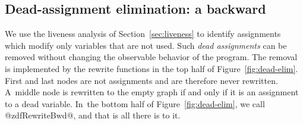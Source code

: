 \documentclass[blockstyle,preprint,nocopyrightspace]{sigplanconf}
\newcommand{\authornote}[1]{{\em #1}}
\def\authornote#1{\unskip\relax}
\newcommand{\simon}[1]{\authornote{SLPJ: #1}}
\newcommand{\norman}[1]{\authornote{NR: #1}}
\let\remark\norman
\newcommand{\john}[1]{\authornote{JD: #1}}
\newcommand\secref[1]{Section~\ref{sec:#1}}
\newcommand\seclabel[1]{\label{sec:#1}}
\newcommand\figref[1]{Figure~\ref{fig:#1}}
\begin{document}
\subsection{Dead-assignment elimination: a backward }
\simon{Backward reference needed to ``Pass 3 of the algorithm described
in the preamble to Section 4''}

\seclabel{dead-code-elimination}
\seclabel{dead-code-elim}

\seclabel{bwd-rewrite}


\def\liveout{$\mathit{live_{out}}$}

We use the liveness analysis of \secref{liveness} to identify
assignments which modify only variables that are not used.
Such \emph{dead assignments} can be removed without changing the
observable behavior of the program.
The removal is implemented by the rewrite functions in the top half of
\figref{dead-elim}. 
First and last nodes are not assignments and are therefore never
rewritten.
A~middle node is rewritten to the empty graph if and only if it is an
assignment to a dead variable.
In~the bottom half of \figref{dead-elim}, we call @zdfRewriteBwd@, and
that is all there is to it.
\john{Need to run this version of the code in anger.}
%
\remark{In this space we should have some guff about
composing transformations, which should refer to the example on
eliminating the induction variable.}
\end{document}
